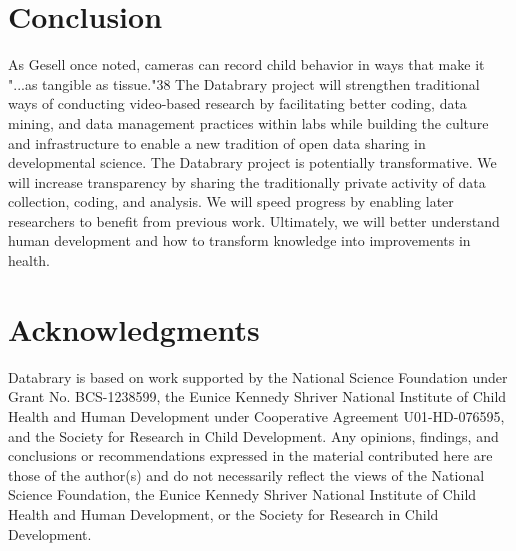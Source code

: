 \documentclass[letterpaper,man,natbib]{apa6}
\begin{document}
\section{Conclusion}
As Gesell once noted, cameras can record child behavior in ways that make it "...as tangible as tissue."38 The Databrary project will strengthen traditional ways of conducting video-based research by facilitating better coding, data mining, and data management practices within labs while building the culture and infrastructure to enable a new tradition of open data sharing in developmental science. The Databrary project is potentially transformative. We will increase transparency by sharing the traditionally private activity of data collection, coding, and analysis. We will speed progress by enabling later researchers to benefit from previous work. Ultimately, we will better understand human development and how to transform knowledge into improvements in health.

\section{Acknowledgments}
Databrary is based on work supported by the National Science Foundation under Grant No. BCS-1238599, the Eunice Kennedy Shriver National Institute of Child Health and Human Development under Cooperative Agreement U01-HD-076595, and the Society for Research in Child Development.
Any opinions, findings, and conclusions or recommendations expressed in the material contributed here are those of the author(s) and do not necessarily reflect the views of the National Science Foundation, the Eunice Kennedy Shriver National Institute of Child Health and Human Development, or the Society for Research in Child Development.


\end{document}

